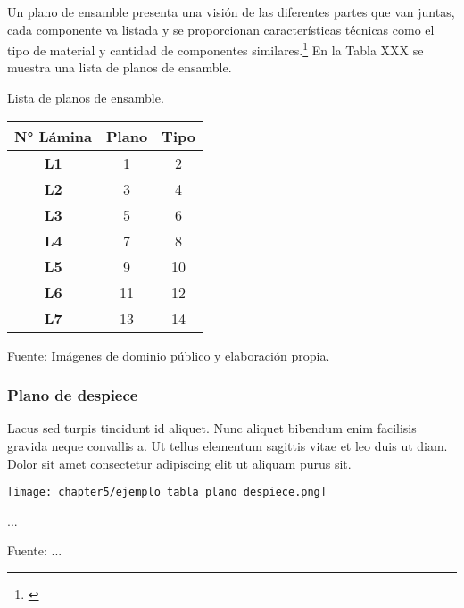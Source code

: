 Un plano de ensamble presenta una visión de las diferentes partes que van juntas, cada componente va listada y se proporcionan características técnicas como el  tipo de material y cantidad de componentes similares.\footnote{\cite{Goetsch2010}} En la Tabla XXX se muestra una lista de planos de ensamble.


\begin{mytable}[H]
	\centering
	\caption{Lista de planos de ensamble.}
	\label{tab:lista de planos de ensamble}
	\begin{tabular}{|c|c|c|}
		\hline
		\textbf{N° Lámina} & \textbf{Plano} & \textbf{Tipo} \\ \hline
		\textbf{L1}        & 1              & 2             \\ \hline
		\textbf{L2}        & 3              & 4             \\ \hline
		\textbf{L3}        & 5              & 6             \\ \hline
		\textbf{L4}        & 7              & 8             \\ \hline
		\textbf{L5}        & 9              & 10            \\ \hline
		\textbf{L6}        & 11             & 12            \\ \hline
		\textbf{L7}        & 13             & 14            \\ \hline
	\end{tabular}
	\begin{flushleft}	
	Fuente: Imágenes de dominio público y elaboración propia.
\end{flushleft}
\end{mytable}


\subsubsection{Plano de despiece}

Lacus sed turpis tincidunt id aliquet. Nunc aliquet bibendum enim facilisis gravida neque convallis a. Ut tellus elementum sagittis vitae et leo duis ut diam. Dolor sit amet consectetur adipiscing elit ut aliquam purus sit. 


\begin{myfigure}[H]
	\centering
	\texttt{[image: chapter5/ejemplo tabla plano despiece.png]}
	\caption{...}
	\begin{myflushleftportland}
		Fuente: ...
	\end{myflushleftportland}
	\label{fig:ejemplo tabla plano despiece}
\end{myfigure}